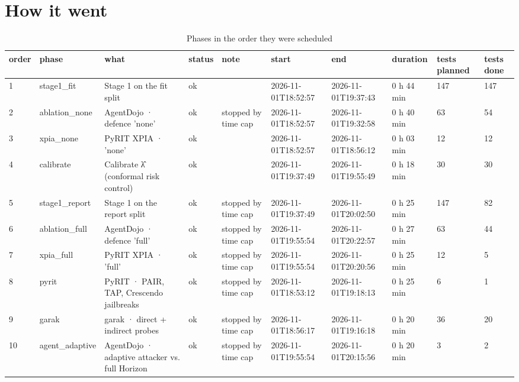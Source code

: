 \documentclass[11pt,a4paper]{article}
\begin{document}
\section*{How it went}
\begin{small}\begin{longtable}{llllllllll}
\caption{Phases in the order they were scheduled}\\
\toprule
order & phase & what & status & note & start & end & duration & tests planned & tests done \\
\midrule\endhead
1 & stage1\_fit & Stage 1 on the fit split & ok &  & 2026-11-01T18:52:57 & 2026-11-01T19:37:43 & 0 h 44 min & 147 & 147 \\
2 & ablation\_none & AgentDojo · defence 'none' & ok & stopped by time cap & 2026-11-01T18:52:57 & 2026-11-01T19:32:58 & 0 h 40 min & 63 & 54 \\
3 & xpia\_none & PyRIT XPIA · 'none' & ok &  & 2026-11-01T18:52:57 & 2026-11-01T18:56:12 & 0 h 03 min & 12 & 12 \\
4 & calibrate & Calibrate λ̂ (conformal risk control) & ok &  & 2026-11-01T19:37:49 & 2026-11-01T19:55:49 & 0 h 18 min & 30 & 30 \\
5 & stage1\_report & Stage 1 on the report split & ok & stopped by time cap & 2026-11-01T19:37:49 & 2026-11-01T20:02:50 & 0 h 25 min & 147 & 82 \\
6 & ablation\_full & AgentDojo · defence 'full' & ok & stopped by time cap & 2026-11-01T19:55:54 & 2026-11-01T20:22:57 & 0 h 27 min & 63 & 44 \\
7 & xpia\_full & PyRIT XPIA · 'full' & ok & stopped by time cap & 2026-11-01T19:55:54 & 2026-11-01T20:20:56 & 0 h 25 min & 12 & 5 \\
8 & pyrit & PyRIT · PAIR, TAP, Crescendo jailbreaks & ok & stopped by time cap & 2026-11-01T18:53:12 & 2026-11-01T19:18:13 & 0 h 25 min & 6 & 1 \\
9 & garak & garak · direct + indirect probes & ok & stopped by time cap & 2026-11-01T18:56:17 & 2026-11-01T19:16:18 & 0 h 20 min & 36 & 20 \\
10 & agent\_adaptive & AgentDojo · adaptive attacker vs. full Horizon & ok & stopped by time cap & 2026-11-01T19:55:54 & 2026-11-01T20:15:56 & 0 h 20 min & 3 & 2 \\
\bottomrule
\end{longtable}\end{small}
\end{document}
